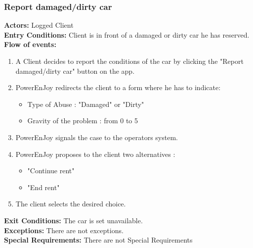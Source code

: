 \subsubsection{Report damaged/dirty car}
%
\textbf{Actors:}
Logged Client \\
%
\textbf{Entry Conditions:}
Client is in front of a damaged or dirty car he has reserved.\\
%
\textbf{Flow of events:}
\begin{enumerate}
\item A Client decides to report the conditions of the car by clicking the "Report damaged/dirty car" button on the app.
\item PowerEnJoy redirects the client to a form where he has to indicate:
\begin{itemize}
\item Type of Abuse : "Damaged" or "Dirty" 
\item Gravity of the problem : from 0 to 5
\end{itemize}
\item PowerEnJoy signals the case to the operators system.
\item PowerEnJoy proposes to the client two alternatives :
\begin{itemize}
\item "Continue rent"
\item "End rent"
\end{itemize}
\item The client selects the desired choice.
\end{enumerate}
%
\textbf{Exit Conditions:}
The car is set unavailable.  \\
\textbf{Exceptions:}
 There are not exceptions. \\
\textbf{Special Requirements:}
 There are not Special Requirements\\

